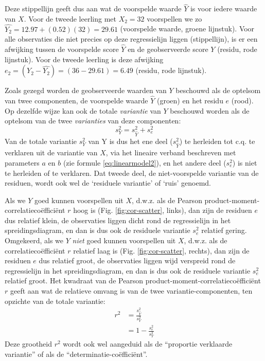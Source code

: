 \documentclass[
]{book}
\begin{document}
Deze stippellijn geeft dus aan wat de voorspelde waarde \(\widehat{Y}\) is
voor iedere waarde van \(X\). Voor de tweede leerling met \(X_2 = 32\)
voorspellen we zo \(\widehat{Y_2} = 12.97 + (0.52) (32) = 29.61\)
(voorspelde waarde, groene lijnstuk). Voor alle observaties die niet
precies op deze regressielijn liggen (stippellijn),
is er een afwijking tussen de voorspelde
score \(\widehat{Y}\) en de geobserveerde score \(Y\) (residu, rode
lijnstuk). Voor de tweede leerling is deze afwijking
\(e_2 = (Y_2 - \widehat{Y_2}) = (36-29.61) = 6.49\) (residu, rode
lijnstuk).

Zoals gezegd worden de geobserveerde waarden van \(Y\) beschouwd als de
optelsom van twee componenten, de voorspelde waarde \(\widehat{Y}\)
(groen) en het residu \(e\) (rood). Op dezelfde wijze kan ook de totale
\emph{variantie} van \(Y\) beschouwd worden als de optelsom van de twee
\emph{varianties} van deze componenten:
\begin{equation}
    s^2_{Y} = s^2_{\widehat{Y}} + s^2_e
  \label{eq:variance-pred-res}
\end{equation}
Van de totale variantie
\(s^2_Y\) van Y is dus het ene deel (\(s^2_{\widehat{Y}}\)) te herleiden tot
c.q. te verklaren uit de variantie van \(X\), via het lineaire verband
beschreven met parameters \(a\) en \(b\) (zie
formule \eqref{eq:linearmodel2}), en het andere deel (\(s^2_e\)) is niet te
herleiden of te verklaren. Dat tweede deel, de niet-voorspelde variantie
van de residuen, wordt ook wel de `residuele variantie' of `ruis'
genoemd.

Als we \(Y\) goed kunnen voorspellen uit \(X\), d.w.z. als de Pearson
product-moment-correlatiecoëfficiënt \(r\) hoog is
(Fig. \ref{fig:cor-scatter}, links), dan zijn de residuen \(e\) dus
relatief klein, de observaties liggen dicht rond de regressielijn in het
spreidingsdiagram, en dan is dus ook de residuele variantie \(s^2_e\)
relatief gering. Omgekeerd, als we \(Y\) \emph{niet} goed kunnen voorspellen
uit \(X\), d.w.z. als de correlatiecoëfficiënt \(r\) relatief laag is
(Fig. \ref{fig:cor-scatter}, rechts), dan zijn de residuen \(e\) dus
relatief groot, de observaties liggen wijd verspreid rond de
regressielijn in het spreidingsdiagram, en dan is dus ook de residuele
variantie \(s^2_e\) relatief groot. Het kwadraat van de Pearson
product-moment-correlatiecoëfficiënt \(r\) geeft aan wat de relatieve
omvang is van de twee variantie-componenten, ten opzichte van de totale
variantie:
\begin{align}
    r^2 & = \frac{s^2_{\widehat{Y}}}{s^2_Y} \\
        & = 1 - \frac{s^2_e}{s^2_Y}
  \label{eq:r2}
\end{align}
Deze grootheid \(r^2\) wordt ook wel aangeduid als de
``proportie verklaarde variantie'' of als de ``determinatie-coëfficiënt''.
\end{document}
